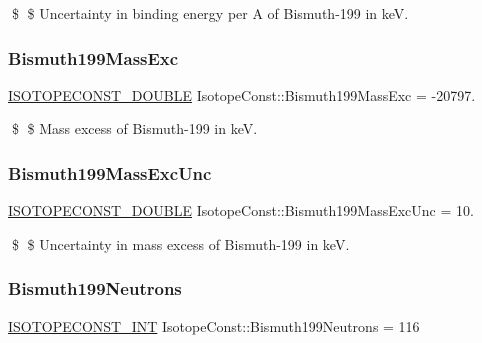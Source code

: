 \$ \$ Uncertainty in binding energy per A of Bismuth-\/199 in keV. \mbox{\label{group___isotope_const-_bismuth-_bi199_gaad6a415f7d7e3b9b8181095e58fe125f}} 
\subsubsection{\texorpdfstring{Bismuth199\+Mass\+Exc}{Bismuth199MassExc}}
{\footnotesize\ttfamily \mbox{\hyperlink{group___isotope_const-_macros_ga8f45a7272ce02c0b4c65c44636ed719a}{I\+S\+O\+T\+O\+P\+E\+C\+O\+N\+S\+T\+\_\+\+D\+O\+U\+B\+LE}} Isotope\+Const\+::\+Bismuth199\+Mass\+Exc = -\/20797.}

\$ \$ Mass excess of Bismuth-\/199 in keV. \mbox{\label{group___isotope_const-_bismuth-_bi199_ga56da397acfa30025513d52b2169f485c}} 
\subsubsection{\texorpdfstring{Bismuth199\+Mass\+Exc\+Unc}{Bismuth199MassExcUnc}}
{\footnotesize\ttfamily \mbox{\hyperlink{group___isotope_const-_macros_ga8f45a7272ce02c0b4c65c44636ed719a}{I\+S\+O\+T\+O\+P\+E\+C\+O\+N\+S\+T\+\_\+\+D\+O\+U\+B\+LE}} Isotope\+Const\+::\+Bismuth199\+Mass\+Exc\+Unc = 10.}

\$ \$ Uncertainty in mass excess of Bismuth-\/199 in keV. \mbox{\label{group___isotope_const-_bismuth-_bi199_ga7b3fd4934a1c09dac909abbe0ae709d6}} 
\subsubsection{\texorpdfstring{Bismuth199\+Neutrons}{Bismuth199Neutrons}}
{\footnotesize\ttfamily \mbox{\hyperlink{group___isotope_const-_macros_ga5f18360b3e99483a35c32d789e62621c}{I\+S\+O\+T\+O\+P\+E\+C\+O\+N\+S\+T\+\_\+\+I\+NT}} Isotope\+Const\+::\+Bismuth199\+Neutrons = 116}

